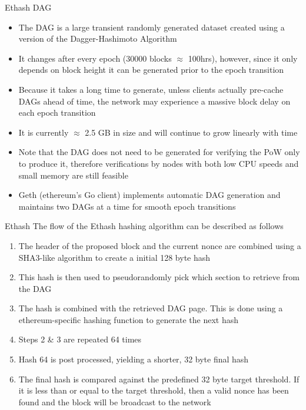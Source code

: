 \documentclass[10pt]{beamer}
\begin{document}

\begin{frame}{Ethash DAG}
	\begin{itemize}
		\item The DAG is a large transient randomly generated dataset created using a version of the Dagger-Hashimoto Algorithm
		\item It changes after every epoch (30000 blocks $\approx$ 100hrs), however, since it only depends on block height it can be generated prior to the epoch transition
		\item Because it takes a long time to generate, unless clients actually pre-cache DAGs ahead of time, the network may experience a massive block delay on each epoch transition
		\item It is currently $\approx$ 2.5 GB in size and will continue to grow linearly with time
		\item Note that the DAG does not need to be generated for verifying the PoW only to produce it, therefore verifications by nodes with both low CPU speeds and small memory are still feasible
		\item Geth (ethereum's Go client) implements automatic DAG generation and maintains two DAGs at a time for smooth epoch transitions
	\end{itemize}
\end{frame}


\begin{frame}{Ethash}
	The flow of the Ethash hashing algorithm can be described as follows
	\begin{enumerate}
		\item The header of the proposed block and the current nonce  are combined using a SHA3-like algorithm to create a initial 128 byte hash
		\item This hash is then used to pseudorandomly pick which section to retrieve from the DAG
		\item The hash is combined with the retrieved DAG page. This is done using a ethereum-specific hashing function to generate the next hash
		\item Steps 2 \& 3 are repeated 64 times
		\item Hash 64 is post processed, yielding a shorter, 32 byte final hash
		\item The final hash is compared against the predefined 32 byte target threshold. If it is less than or equal to the target threshold, then a valid nonce has been found and the block will be broadcast to the network
	\end{enumerate}
\end{frame}
\end{document}
